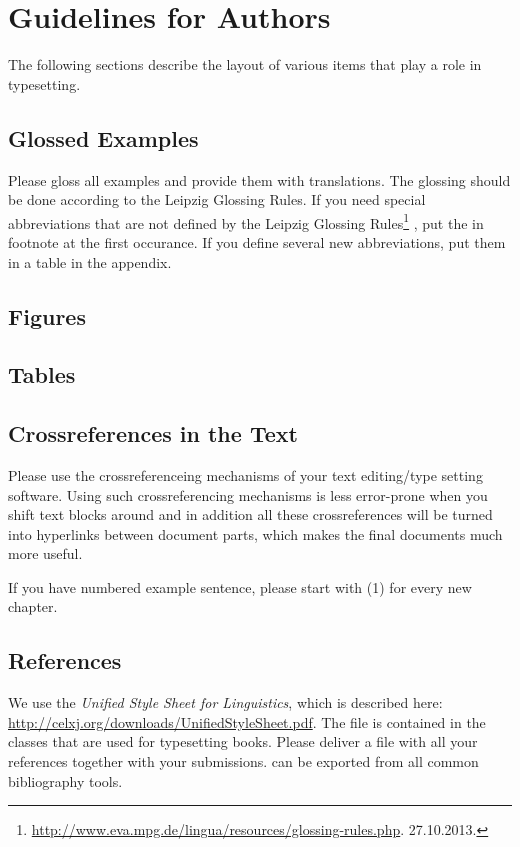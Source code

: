 \chapter{Guidelines for Authors}

The following sections describe the layout of various items that play a role in typesetting. 

\section{Glossed Examples}

Please gloss all examples and provide them with translations. The glossing should be done according
to the Leipzig Glossing Rules. If you need special abbreviations that are not defined by the Leipzig
Glossing Rules\footnote{
\url{http://www.eva.mpg.de/lingua/resources/glossing-rules.php}. 27.10.2013.
}
, put the in footnote at the first occurance. If you
define several new abbreviations, put them in a table in the appendix.


\section{Figures}

\section{Tables}

\section{Crossreferences in the Text}

Please use the crossreferenceing mechanisms of your text editing/type setting software. Using such
crossreferencing mechanisms is less error-prone when you shift text blocks around and in addition
all these crossreferences will be turned into hyperlinks between document parts, which makes the
final documents much more useful.

If you have numbered example sentence, please start with (1) for every new chapter.

\section{References}


We use the \emph{Unified Style Sheet for Linguistics}, which is described here:
\url{http://celxj.org/downloads/UnifiedStyleSheet.pdf}. The \bibtex file is contained in the \latex
classes that are used for typesetting \lsp books. Please deliver a \bibtex file with all your
references together with your submissions. \bibtex can be exported from all common bibliography
tools.

